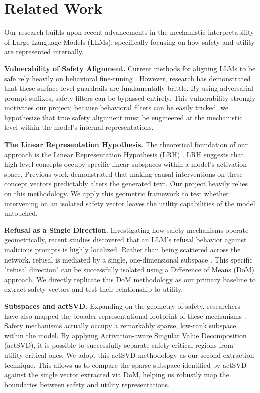 \section{Related Work}

Our research builds upon recent advancements in the mechanistic interpretability of Large Language Models (LLMs), specifically focusing on how safety and utility are represented internally. 

\textbf{Vulnerability of Safety Alignment.} 
Current methods for aligning LLMs to be safe rely heavily on behavioral fine-tuning \cite{zou2023gcg}. However, research has demonstrated that these surface-level guardrails are fundamentally brittle. By using adversarial prompt suffixes, safety filters can be bypassed entirely. This vulnerability strongly motivates our project; because behavioral filters can be easily tricked, we hypothesize that true safety alignment must be engineered at the mechanistic level within the model's internal representations.

\textbf{The Linear Representation Hypothesis.} 
The theoretical foundation of our approach is the Linear Representation Hypothesis (LRH) \cite{park2023LRH}. LRH suggests that high-level concepts occupy specific linear subspaces within a model's activation space. Previous work demonstrated that making causal interventions on these concept vectors predictably alters the generated text. Our project heavily relies on this methodology. We apply this geometric framework to test whether intervening on an isolated safety vector leaves the utility capabilities of the model untouched.

\textbf{Refusal as a Single Direction.} 
Investigating how safety mechanisms operate geometrically, recent studies discovered that an LLM's refusal behavior against malicious prompts is highly localized. Rather than being scattered across the network, refusal is mediated by a single, one-dimensional subspace \cite{arditi2024refusal}. This specific "refusal direction" can be successfully isolated using a Difference of Means (DoM) approach. We directly replicate this DoM methodology as our primary baseline to extract safety vectors and test their relationship to utility.

\textbf{Subspaces and actSVD.} 
Expanding on the geometry of safety, researchers have also mapped the broader representational footprint of these mechanisms \cite{wei2024brittleness}. Safety mechanisms actually occupy a remarkably sparse, low-rank subspace within the model. By applying Activation-aware Singular Value Decomposition (actSVD), it is possible to successfully separate safety-critical regions from utility-critical ones. We adopt this actSVD methodology as our second extraction technique. This allows us to compare the sparse subspace identified by actSVD against the single vector extracted via DoM, helping us robustly map the boundaries between safety and utility representations.

